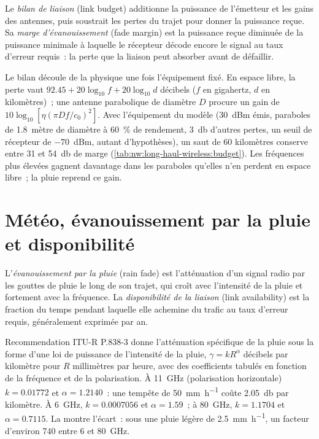 \begin{definition}\label{def:nw:long-haul-wireless:budget}
Le \emph{bilan de liaison} (link budget) additionne la puissance de l'émetteur et les gains des antennes, puis soustrait les pertes du trajet pour donner la
puissance reçue. Sa \emph{marge d'évanouissement} (fade margin) est la puissance reçue diminuée de la puissance minimale à laquelle le récepteur décode encore le
signal au taux d'erreur requis~: la perte que la liaison peut absorber avant de défaillir.
\end{definition}

Le bilan découle de la physique une fois l'équipement fixé. En espace libre, la perte vaut $92.45 + 20\log_{10} f + 20\log_{10} d$ décibels ($f$ en
gigahertz, $d$ en kilomètres)~; une antenne parabolique de diamètre $D$ procure un gain de $10\log_{10}[\eta(\pi D f/c_0)^2]$. Avec l'équipement du modèle (30~dBm
émis, paraboles de 1.8~mètre de diamètre à 60~\% de rendement, \qty{3}{\decibel} d'autres pertes, un seuil de récepteur de $-70$~dBm, autant d'hypothèses),
un saut de 60 kilomètres conserve entre 31 et \qty{54}{\decibel} de marge (\cref{tab:nw:long-haul-wireless:budget}). Les fréquences plus élevées gagnent davantage dans
les paraboles qu'elles n'en perdent en espace libre~; la pluie reprend ce gain.

\section{Météo, évanouissement par la pluie et disponibilité}

\begin{definition}\label{def:nw:long-haul-wireless:rain}
L'\emph{évanouissement par la pluie} (rain fade) est l'atténuation d'un signal radio par les gouttes de pluie le long de son trajet, qui croît avec l'intensité de la pluie et fortement
avec la fréquence. La \emph{disponibilité de la liaison} (link availability) est la fraction du temps pendant laquelle elle achemine du trafic au
taux d'erreur requis, généralement exprimée par an.
\end{definition}

Recommendation ITU-R P.838-3 donne l'atténuation spécifique de la pluie sous la forme d'une loi de puissance de l'intensité de la pluie, $\gamma = k R^{\alpha}$ décibels par kilomètre
pour $R$ millimètres par heure, avec des coefficients tabulés en fonction de la fréquence et de la polarisation. À \qty{11}{\giga\hertz} (polarisation horizontale)
$k = 0.01772$ et $\alpha = 1.2140$~: une tempête de \qty{50}{\milli\metre\per\hour} coûte \qty{2.05}{\decibel} par kilomètre. À \qty{6}{\giga\hertz},
$k = 0.0007056$ et $\alpha = 1.59$~; à \qty{80}{\giga\hertz}, $k = 1.1704$ et $\alpha = 0.7115$.
La  montre l'écart~: sous une pluie légère de \qty{2.5}{\milli\metre\per\hour}, un facteur d'environ 740 entre 6 et \qty{80}{\giga\hertz}.

